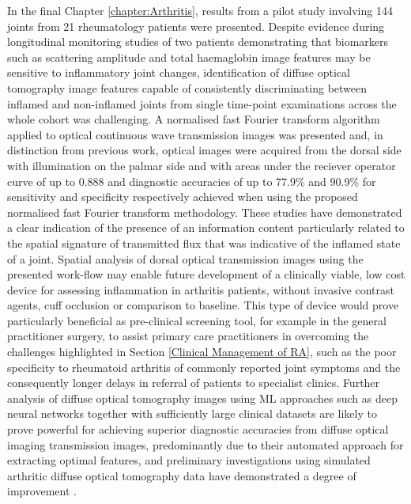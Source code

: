 \documentclass[twoside]{bhamthesis}
\theoremstyle{definition}
\begin{document}
In the final Chapter \ref{chapter:Arthritis}, results from a pilot study involving 144 joints from 21 rheumatology patients were presented. Despite evidence during longitudinal monitoring studies of two patients demonstrating that biomarkers such as scattering amplitude and total haemaglobin image features may be sensitive to inflammatory joint changes, identification of diffuse optical tomography image features capable of consistently discriminating between inflamed and non-inflamed joints from single time-point examinations across the whole cohort was challenging. A normalised fast Fourier transform algorithm applied to optical continuous wave transmission images was presented and, in distinction from previous work, optical images were acquired from the dorsal side with illumination on the palmar side and with areas under the reciever operator curve of up to 0.888 and diagnostic accuracies of up to 77.9\% and 90.9\% for sensitivity and specificity respectively achieved when using the proposed normalised fast Fourier transform methodology. These studies have demonstrated a clear indication of the presence of an information content particularly related to the spatial signature of transmitted flux that was indicative of the inflamed state of a joint. Spatial analysis of dorsal optical transmission images using the presented work-flow may enable future development of a clinically viable, low cost device for assessing inflammation in arthritis patients, without invasive contrast agents, cuff occlusion or comparison to baseline. This type of device would prove particularly beneficial as pre-clinical screening tool, for example in the general practitioner surgery, to assist primary care practitioners in overcoming the challenges highlighted in Section \ref{Clinical Management of RA}, such as the poor specificity to rheumatoid arthritis of commonly reported joint symptoms and the consequently longer delays in referral of patients to specialist clinics. Further analysis of diffuse optical tomography images using ML approaches such as deep neural networks together with sufficiently large clinical datasets are likely to prove powerful for achieving superior diagnostic accuracies from diffuse optical imaging transmission images, predominantly due to their automated approach for extracting optimal features, and preliminary investigations using simulated arthritic diffuse optical tomography data have demonstrated a degree of improvement \cite{dehghani2019deep,feng2020application}. 
\end{document}
